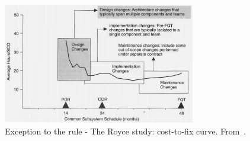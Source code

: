 \ei


\begin{figure}
 \includegraphics[width=3.3in]{img/Royce98.png}
 \caption{Exception to the rule - The Royce study: cost-to-fix curve. From~\cite{Royce98}.}\label{fig:royce}
 \end{figure}